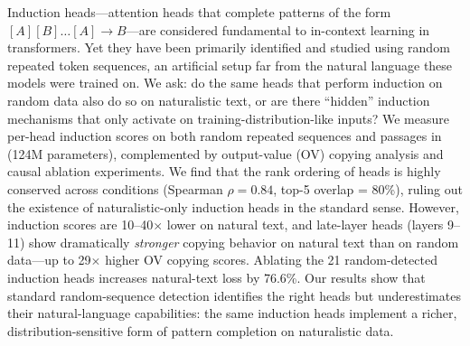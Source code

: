Induction heads---attention heads that complete patterns of the form $[A][B]\ldots[A] \rightarrow B$---are considered fundamental to in-context learning in transformers.
Yet they have been primarily identified and studied using random repeated token sequences, an artificial setup far from the natural language these models were trained on.
We ask: do the same heads that perform induction on random data also do so on naturalistic text, or are there ``hidden'' induction mechanisms that only activate on training-distribution-like inputs?
We measure per-head induction scores on both random repeated sequences and \owt passages in \gpttwo (124M parameters), complemented by output-value (OV) copying analysis and causal ablation experiments.
We find that the rank ordering of heads is highly conserved across conditions (Spearman $\rho = 0.84$, top-5 overlap = 80\%), ruling out the existence of naturalistic-only induction heads in the standard sense.
However, induction scores are 10--40$\times$ lower on natural text, and late-layer heads (layers 9--11) show dramatically \emph{stronger} copying behavior on natural text than on random data---up to 29$\times$ higher OV copying scores.
Ablating the 21 random-detected induction heads increases natural-text loss by 76.6\%.
Our results show that standard random-sequence detection identifies the right heads but underestimates their natural-language capabilities: the same induction heads implement a richer, distribution-sensitive form of pattern completion on naturalistic data.
